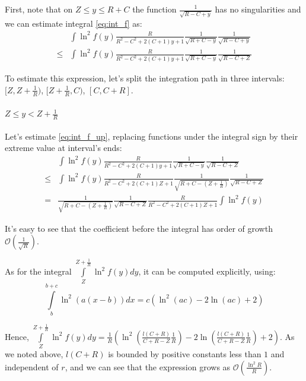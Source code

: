 \documentclass{gCOV2e}
\theoremstyle{plain}%
\theoremstyle{definition}
\theoremstyle{remark}
\newcommand{\mcO}{\mathcal{O}} %
\begin{document}
First, note that on $Z \le y \le R + C$ the function $\frac{1}{\sqrt{R - C + y}}$ has no singularities and we can estimate integral \ref{eq:int_f} as:
\begin{equation}\label{eq:int_f_up}
\begin{aligned}
       & \int \ln^2 f(y) \frac{R}{R^2 - C^2 + 2 (C + 1) y + 1} \frac{1}{\sqrt{R + C - y}} \frac{1}{\sqrt{R - C + y}}
\\ \le & \int \ln^2 f(y) \frac{R}{R^2 - C^2 + 2 (C + 1) y + 1} \frac{1}{\sqrt{R + C - y}} \frac{1}{\sqrt{R - C + Z}} 
\end{aligned}
\end{equation}

To estimate this expression, let's split the integration path in three intervals: $[Z, Z + \frac{1}{R})$, $[Z + \frac{1}{R}, C)$, $[C, C + R]$.

\paragraph{$Z \le y < Z + \frac{1}{R}$}

Let's estimate \ref{eq:int_f_up}, replacing functions under the integral sign by their extreme value at interval's ends:
\begin{align*}
       & \int \ln^2 f(y) \frac{R}{R^2 - C^2 + 2 (C + 1) y + 1} \frac{1}{\sqrt{R + C - y}} \frac{1}{\sqrt{R - C + Z}}
\\ \le & \int \ln^2 f(y) \frac{R}{R^2 - C^2 + 2 (C + 1) Z + 1} \frac{1}{\sqrt{R + C - (Z + \frac{1}{R})}} \frac{1}{\sqrt{R - C + Z}}
\\ =   & \frac{1}{\sqrt{R + C - (Z + \frac{1}{R})}} \frac{1}{\sqrt{R - C + Z}} \frac{R}{R^2 - C^2 + 2 (C + 1) Z + 1} \int \ln^2 f(y) 
\end{align*}

It's easy to see that the coefficient before the integral has order of growth $\mcO\left(\frac{1}{\sqrt{R}}\right)$.

As for the integral $\int\limits_{Z}^{Z + \frac{1}{R}} \ln^2 f(y) dy$, it can be computed explicitly, using:
\[
    \int\limits_b^{b + c} \ln^2 (a (x - b)) dx = c (\ln^2(a c) - 2 \ln (a c) + 2)
\]

Hence, $\int\limits_{Z}^{Z + \frac{1}{R}} \ln^2 f(y) dy = \frac{1}{R} ( \ln^2 (\frac{l(C + R)}{C + R - Z} \frac{1}{R}) - 2 \ln (\frac{l(C + R)}{C + R - Z} \frac{1}{R}) + 2)$. As we noted above, $l(C + R)$ is bounded by positive constants less than $1$ and independent of $r$, and we can see that the expression grows as $\mcO(\frac{\ln^2 R}{R})$.
\end{document}
